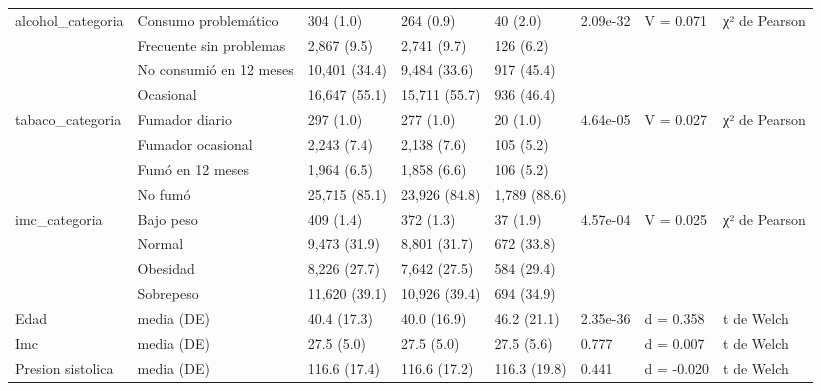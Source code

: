 \begin{table}[htbp]
\begin{tabular}{llllllll}
alcohol\_categoria & Consumo problemático & 304 (1.0) & 264 (0.9) & 40 (2.0) & 2.09e-32 & V = 0.071 & χ² de Pearson \\
 & Frecuente sin problemas & 2,867 (9.5) & 2,741 (9.7) & 126 (6.2) &  &  &  \\
 & No consumió en 12 meses & 10,401 (34.4) & 9,484 (33.6) & 917 (45.4) &  &  &  \\
 & Ocasional & 16,647 (55.1) & 15,711 (55.7) & 936 (46.4) &  &  &  \\
tabaco\_categoria & Fumador diario & 297 (1.0) & 277 (1.0) & 20 (1.0) & 4.64e-05 & V = 0.027 & χ² de Pearson \\
 & Fumador ocasional & 2,243 (7.4) & 2,138 (7.6) & 105 (5.2) &  &  &  \\
 & Fumó en 12 meses & 1,964 (6.5) & 1,858 (6.6) & 106 (5.2) &  &  &  \\
 & No fumó & 25,715 (85.1) & 23,926 (84.8) & 1,789 (88.6) &  &  &  \\
imc\_categoria & Bajo peso & 409 (1.4) & 372 (1.3) & 37 (1.9) & 4.57e-04 & V = 0.025 & χ² de Pearson \\
 & Normal & 9,473 (31.9) & 8,801 (31.7) & 672 (33.8) &  &  &  \\
 & Obesidad & 8,226 (27.7) & 7,642 (27.5) & 584 (29.4) &  &  &  \\
 & Sobrepeso & 11,620 (39.1) & 10,926 (39.4) & 694 (34.9) &  &  &  \\
Edad & media (DE) & 40.4 (17.3) & 40.0 (16.9) & 46.2 (21.1) & 2.35e-36 & d = 0.358 & t de Welch \\
Imc & media (DE) & 27.5 (5.0) & 27.5 (5.0) & 27.5 (5.6) & 0.777 & d = 0.007 & t de Welch \\
Presion sistolica & media (DE) & 116.6 (17.4) & 116.6 (17.2) & 116.3 (19.8) & 0.441 & d = -0.020 & t de Welch \\
\bottomrule
\end{tabular}
\end{table}
